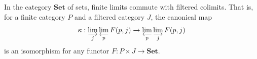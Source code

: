  In the category $\mathbf{Set}$ of sets, finite limits commute with filtered colimits. That is, for a finite category $P$ and a filtered category $J$, the canonical map
$$
\kappa : \varinjlim_j \varprojlim_p F(p,j) \to \varprojlim_p \varinjlim_j F(p,j)
$$
is an isomorphism for any functor $F : P \times J \to \mathbf{Set}$.
